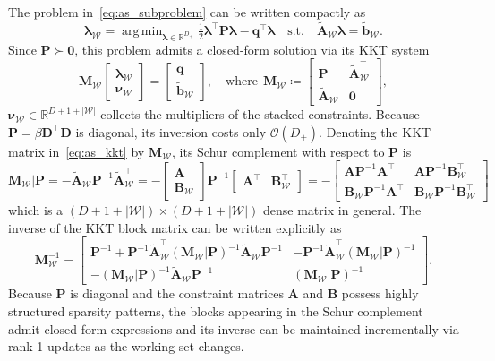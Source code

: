 \documentclass[a4paper,12pt,openany]{book}
\newcommand{\A}{\mathbf{A}}
\newcommand{\B}{\mathbf{B}}
\newcommand{\D}{\mathbf{D}}
\newcommand{\M}{\mathbf{M}}
\renewcommand{\P}{\mathbf{P}}
\newcommand{\R}{\mathbb{R}}
\renewcommand{\b}{\mathbf{b}}
\newcommand{\q}{\mathbf{q}}
\newcommand{\lh}{\boldsymbol{\lambda}}
\DeclareMathOperator*{\argmin}{arg\,min}
\begin{document}
\begin{appendices}
The problem in~\eqref{eq:as_subproblem} can be written compactly as
\begin{equation}
	\lh_\mathcal{W}=\argmin_{\lh\in\R^{D_+}}\tfrac{1}{2}\lh^\top\P\lh-\q^\top\lh
	\quad\text{s.t.}\quad\tilde{\A}_\mathcal{W}\lh=\tilde{\b}_\mathcal{W}.
\end{equation}
Since $\P\succ\mathbf{0}$, this problem admits a closed-form solution via its KKT system
\begin{equation}\label{eq:as_kkt}
	\M_\mathcal{W}
	\begin{bmatrix}
		\lh_\mathcal{W} \\
		\boldsymbol{\nu}_\mathcal{W}
	\end{bmatrix}
	=
	\begin{bmatrix}
		\q \\
		\tilde{\b}_\mathcal{W}
	\end{bmatrix},\quad 
	\text{where}\ \
	\M_\mathcal{W}\coloneqq\begin{bmatrix}
		\P & \tilde{\A}_\mathcal{W}^\top \\
		\tilde{\A}_\mathcal{W} & \mathbf{0}
	\end{bmatrix},
\end{equation}
$\boldsymbol{\nu}_\mathcal{W}\in\R^{D + 1 + |\mathcal{W}|}$ collects the multipliers of the stacked constraints. Because $\P=\beta\D^\top\D$ is diagonal, its inversion costs only $\mathcal{O}(D_+)$. Denoting the KKT matrix in~\eqref{eq:as_kkt} by $\M_\mathcal{W}$, its Schur complement with respect to $\P$ is
\begin{equation}\label{eq:active_set_schur_comp}
	\M_\mathcal{W}|\P = -\tilde{\A}_\mathcal{W}\P^{-1}\tilde{\A}_\mathcal{W}^\top = -\begin{bmatrix}\A\\\B_\mathcal{W}\end{bmatrix}\P^{-1}\begin{bmatrix}\A^\top & \B_\mathcal{W}^\top\end{bmatrix}=  -\begin{bmatrix}\A\P^{-1}\A^\top & \A\P^{-1}\B_\mathcal{W}^\top \\ \B_\mathcal{W}\P^{-1}\A^\top & \B_\mathcal{W}\P^{-1}\B_\mathcal{W}^\top\end{bmatrix}
\end{equation}
which is a $(D+1+|\mathcal{W}|)\times(D+1+|\mathcal{W}|)$ dense matrix in general. The inverse of the KKT block matrix can be written explicitly as
\begin{equation}
	\M_\mathcal{W}^{-1} = 
	\begin{bmatrix}
		\P^{-1}+\P^{-1}\tilde{\A}_\mathcal{W}^\top(\M_\mathcal{W}|\P)^{-1}\tilde{\A}_\mathcal{W}\P^{-1} & -\P^{-1}\tilde{\A}_\mathcal{W}^\top(\M_\mathcal{W}|\P)^{-1} \\
		-(\M_\mathcal{W}|\P)^{-1}\tilde{\A}_\mathcal{W}\P^{-1} & (\M_\mathcal{W}|\P)^{-1}
	\end{bmatrix}.	
\end{equation}
Because $\P$ is diagonal and the constraint matrices $\A$ and $\B$ possess highly structured sparsity patterns, the blocks appearing in the Schur complement admit closed-form expressions and its inverse can be maintained incrementally via rank-1 updates as the working set changes.


\end{appendices}
\end{document}
